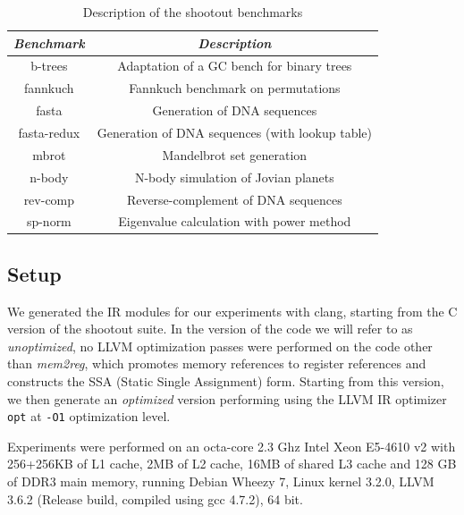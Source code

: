\begin{table} 
\begin{center}
\begin{small}
    \begin{tabular}{ |c|c| }
        \hline
        {\em Benchmark} & {\em Description} \\ 
        \hline
        \hline
        b-trees & Adaptation of a GC bench for binary trees \\ 
        \hline
        fannkuch & Fannkuch benchmark on permutations \\ 
        \hline
        fasta & Generation of DNA sequences \\ 
        \hline
        fasta-redux & Generation of DNA sequences (with lookup table) \\ 
        \hline
        mbrot & Mandelbrot set generation \\ 
        \hline
        n-body & N-body simulation of Jovian planets \\ 
        \hline
        rev-comp & Reverse-complement of DNA sequences \\ 
        \hline
        sp-norm & Eigenvalue calculation with power method \\ 
        \hline
    \end{tabular} 
\end{small}
\end{center}
\caption{\label{tab:shootout} Description of the shootout benchmarks} 
\end{table}

\subsection{Setup}

We generated the IR modules for our experiments with clang, starting from the C version of the shootout suite. In the version of the code we will refer to as {\em unoptimized}, no LLVM optimization passes were performed on the code other than {\em mem2reg}, which promotes memory references to register references and constructs the SSA (Static Single Assignment) form. Starting from this version, we then generate an {\em optimized} version performing using the LLVM IR optimizer {\tt opt} at {\tt -O1} optimization level.

Experiments were performed on an octa-core 2.3 Ghz Intel Xeon E5-4610 v2 with 256+256KB of L1 cache, 2MB of L2 cache, 16MB of shared L3 cache and 128 GB of DDR3 main memory, running Debian Wheezy 7, Linux kernel 3.2.0, LLVM 3.6.2 (Release build, compiled using gcc 4.7.2), 64 bit.

